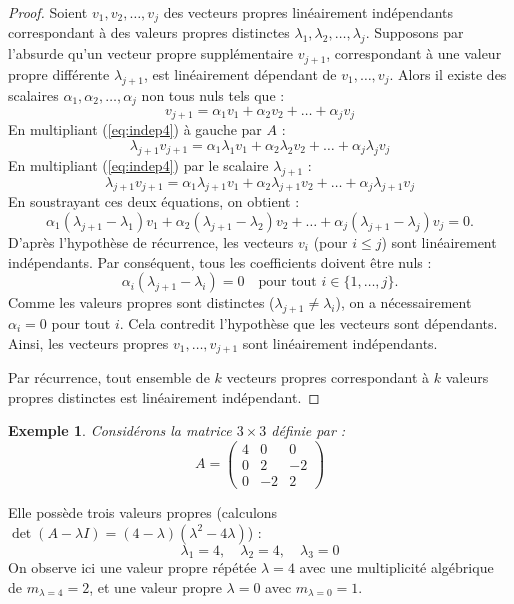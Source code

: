 \documentclass[12pt]{report}
\newtheorem{example}{Exemple}
\begin{document}
\begin{proof}
    \noindent Soient $v_1, v_2, \dots, v_j$ des vecteurs propres linéairement indépendants correspondant à des valeurs propres distinctes $\lambda_1, \lambda_2, \dots, \lambda_j$. Supposons par l'absurde qu'un vecteur propre supplémentaire $v_{j+1}$, correspondant à une valeur propre différente $\lambda_{j+1}$, est linéairement dépendant de $v_1, \dots, v_j$. Alors il existe des scalaires $\alpha_1, \alpha_2, \dots, \alpha_j$ non tous nuls tels que :
    \begin{equation} \label{eq:indep4}
        v_{j+1} = \alpha_1 v_1 + \alpha_2 v_2 + \dots + \alpha_j v_j
    \end{equation}
    En multipliant (\ref{eq:indep4}) à gauche par $A$ :
    \begin{equation} \label{eq:indep5}
        \lambda_{j+1} v_{j+1} = \alpha_1 \lambda_1 v_1 + \alpha_2 \lambda_2 v_2 + \dots + \alpha_j \lambda_j v_j
    \end{equation}
    En multipliant (\ref{eq:indep4}) par le scalaire $\lambda_{j+1}$ :
    \begin{equation} \label{eq:indep6}
        \lambda_{j+1} v_{j+1} = \alpha_1 \lambda_{j+1} v_1 + \alpha_2 \lambda_{j+1} v_2 + \dots + \alpha_j \lambda_{j+1} v_j
    \end{equation}
    En soustrayant ces deux équations, on obtient :
    \[
        \alpha_1 (\lambda_{j+1} - \lambda_1) v_1 + \alpha_2 (\lambda_{j+1} - \lambda_2) v_2 + \dots + \alpha_j (\lambda_{j+1} - \lambda_j) v_j = 0.
    \]
    D'après l'hypothèse de récurrence, les vecteurs $v_i$ (pour $i \le j$) sont linéairement indépendants. Par conséquent, tous les coefficients doivent être nuls :
    \[
        \alpha_i (\lambda_{j+1} - \lambda_i) = 0 \quad \text{pour tout } i \in \{1, \dots, j\}.
    \]
    Comme les valeurs propres sont distinctes ($\lambda_{j+1} \neq \lambda_i$), on a nécessairement $\alpha_i = 0$ pour tout $i$. Cela contredit l'hypothèse que les vecteurs sont dépendants. Ainsi, les vecteurs propres $v_1, \dots, v_{j+1}$ sont linéairement indépendants.

    \noindent Par récurrence, tout ensemble de $k$ vecteurs propres correspondant à $k$ valeurs propres distinctes est linéairement indépendant.
\end{proof}

\begin{example}
    Considérons la matrice $3 \times 3$ définie par :
    \[
        A = \begin{pmatrix}
            4 & 0  & 0  \\
            0 & 2  & -2 \\
            0 & -2 & 2
        \end{pmatrix}
    \]
\end{example}
\noindent Elle possède trois valeurs propres (calculons $\det(A-\lambda I) = (4-\lambda)(\lambda^2 - 4\lambda)$) :
\[
    \lambda_1 = 4, \quad \lambda_2 = 4, \quad \lambda_3 = 0
\]
On observe ici une valeur propre répétée $\lambda = 4$ avec une {multiplicité algébrique} de $m_{\lambda=4} = 2$, et une valeur propre $\lambda = 0$ avec $m_{\lambda=0} = 1$.
\end{document}
